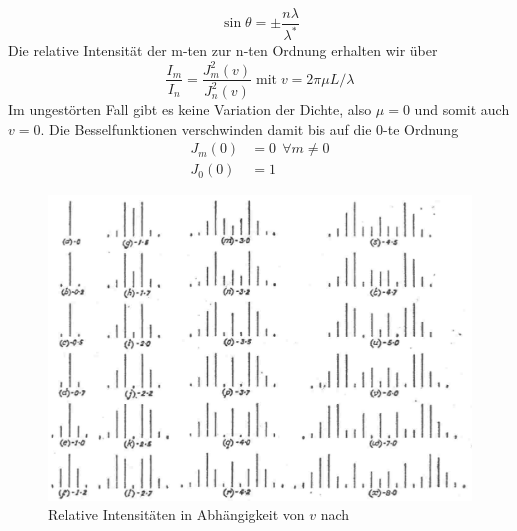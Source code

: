 \begin{equation}
  \sin \theta = \pm \frac{n \lambda}{\lambda^*} 
\end{equation}
Die relative Intensität der m-ten zur n-ten Ordnung erhalten wir über
\begin{equation}
  \frac{I_m}{I_n} = \frac{J_m^2(v)}{J_n^2(v)}  \; \text{mit} \; v = 2 \pi \mu L / \lambda
\end{equation}
Im ungestörten Fall gibt es keine Variation der Dichte, also $\mu = 0$ und somit auch $v=0$. Die Besselfunktionen verschwinden damit bis auf die 0-te Ordnung
\begin{align}
 J_m(0) & = 0 \ \ \forall m \neq 0 \\
 J_0(0) & = 1
\end{align}
 

\begin{figure}[H]
 \centering \includegraphics{Bilder/bessel-funktionen.jpg}
 \caption{Relative Intensitäten in Abhängigkeit von $v$ nach \cite{Raman}}
 \label{raman-bilder}
\end{figure}

